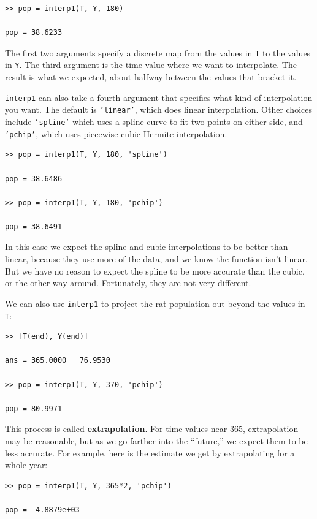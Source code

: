 \documentclass{book}
\begin{document}
\begin{verbatim}
>> pop = interp1(T, Y, 180)

pop = 38.6233
\end{verbatim}

The first two arguments specify a discrete map from the values in
{\tt T} to the values in {\tt Y}.  The third argument is the
time value where we want to interpolate.  The result is what
we expected, about halfway between the values that bracket it.

{\tt interp1} can also take a fourth argument that specifies what
kind of interpolation you want.  The default is {\tt 'linear'}, which
does linear interpolation.  Other choices include {\tt 'spline'}
which uses a spline curve to fit two points on either side,
and {\tt 'pchip'}, which uses piecewise cubic Hermite interpolation.

\begin{verbatim}
>> pop = interp1(T, Y, 180, 'spline')

pop = 38.6486

>> pop = interp1(T, Y, 180, 'pchip')

pop = 38.6491
\end{verbatim}

In this case we expect the spline and cubic interpolations to be
better than linear, because they use more of the data, and we know the
function isn't linear.  But we have no reason to expect the spline to
be more accurate than the cubic, or the other way around.
Fortunately, they are not very different.

We can also use {\tt interp1} to project the rat population out
beyond the values in {\tt T}:

\begin{verbatim}
>> [T(end), Y(end)]

ans = 365.0000   76.9530

>> pop = interp1(T, Y, 370, 'pchip')

pop = 80.9971
\end{verbatim}

This process is called {\bf extrapolation}.  For time values near
365, extrapolation may be reasonable, but as we go farther into
the ``future,'' we expect them to be less accurate.
For example, here is the estimate we get by extrapolating for a whole
year:

\begin{verbatim}
>> pop = interp1(T, Y, 365*2, 'pchip')

pop = -4.8879e+03
\end{verbatim}
\end{document}
